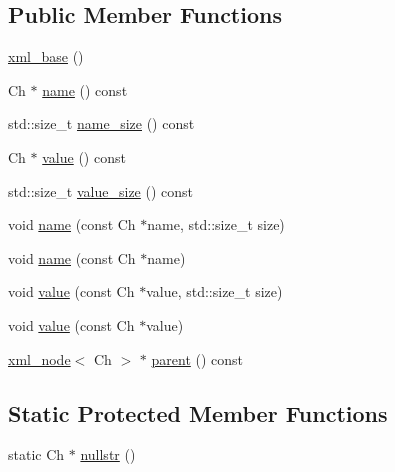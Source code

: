 \subsection*{Public Member Functions}
\begin{DoxyCompactItemize}
\item 
\mbox{\hyperlink{classrapidxml_1_1xml__base_a23e7f7aac02d17a0a01afb597e4b966b}{xml\+\_\+base}} ()
\item 
Ch $\ast$ \mbox{\hyperlink{classrapidxml_1_1xml__base_aef8ae147fbee59209f714274afc80dc4}{name}} () const
\item 
std\+::size\+\_\+t \mbox{\hyperlink{classrapidxml_1_1xml__base_a20c8ffbe0c7a0b4231681ab8b99330a4}{name\+\_\+size}} () const
\item 
Ch $\ast$ \mbox{\hyperlink{classrapidxml_1_1xml__base_a6af65de5e59ac497cd69838f8a89d602}{value}} () const
\item 
std\+::size\+\_\+t \mbox{\hyperlink{classrapidxml_1_1xml__base_a2eb123d471b1567fa4832b6ee2b75493}{value\+\_\+size}} () const
\item 
void \mbox{\hyperlink{classrapidxml_1_1xml__base_ae55060ae958c6e6465d6c8db852ec6ce}{name}} (const Ch $\ast$name, std\+::size\+\_\+t size)
\item 
void \mbox{\hyperlink{classrapidxml_1_1xml__base_a4611ddc82ac83a527c65606600eb2a0d}{name}} (const Ch $\ast$name)
\item 
void \mbox{\hyperlink{classrapidxml_1_1xml__base_a3b183c2db7022a6d30494dd2f0ac11e9}{value}} (const Ch $\ast$value, std\+::size\+\_\+t size)
\item 
void \mbox{\hyperlink{classrapidxml_1_1xml__base_a81e63ec4bfd2d7ef0a6c2ed49be6e623}{value}} (const Ch $\ast$value)
\item 
\mbox{\hyperlink{classrapidxml_1_1xml__node}{xml\+\_\+node}}$<$ Ch $>$ $\ast$ \mbox{\hyperlink{classrapidxml_1_1xml__base_aa807062868d671a8c798d9d1bf016988}{parent}} () const
\end{DoxyCompactItemize}
\subsection*{Static Protected Member Functions}
\begin{DoxyCompactItemize}
\item 
static Ch $\ast$ \mbox{\hyperlink{classrapidxml_1_1xml__base_ad96ff6b1e41dab3ff60b9bc4df769a75}{nullstr}} ()
\end{DoxyCompactItemize}
